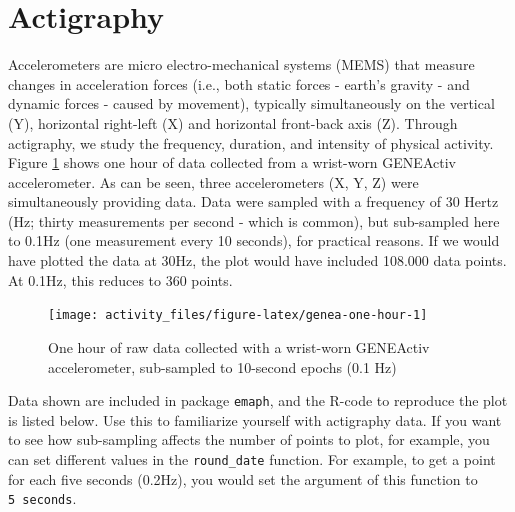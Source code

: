 \documentclass[]{book}
\begin{document}
\section{Actigraphy}\label{actigraphy}

  

Accelerometers are micro electro-mechanical systems (MEMS) that measure
changes in acceleration forces (i.e., both static forces - earth's
gravity - and dynamic forces - caused by movement), typically
simultaneously on the vertical (Y), horizontal right-left (X) and
horizontal front-back axis (Z). Through actigraphy, we study the
frequency, duration, and intensity of physical activity. Figure
\ref{fig:genea-one-hour} shows one hour of data collected from a
wrist-worn GENEActiv accelerometer. As can be seen, three accelerometers
(X, Y, Z) were simultaneously providing data. Data were sampled with a
frequency of 30 Hertz (Hz; thirty measurements per second - which is
common), but sub-sampled here to 0.1Hz (one measurement every 10
seconds), for practical reasons. If we would have plotted the data at
30Hz, the plot would have included 108.000 data points. At 0.1Hz, this
reduces to 360 points.

\begin{figure}

{\centering \texttt{[image: activity\_files/figure-latex/genea-one-hour-1]} 

}

\caption{One hour of raw data collected with a wrist-worn GENEActiv accelerometer, sub-sampled to 10-second epochs (0.1 Hz)}\label{fig:genea-one-hour}
\end{figure}

Data shown are included in package \texttt{emaph}, and the R-code to
reproduce the plot is listed below. Use this to familiarize yourself
with actigraphy data. If you want to see how sub-sampling affects the
number of points to plot, for example, you can set different values in
the \texttt{round\_date} function. For example, to get a point for each
five seconds (0.2Hz), you would set the argument of this function to
\texttt{5\ seconds}.
\end{document}
